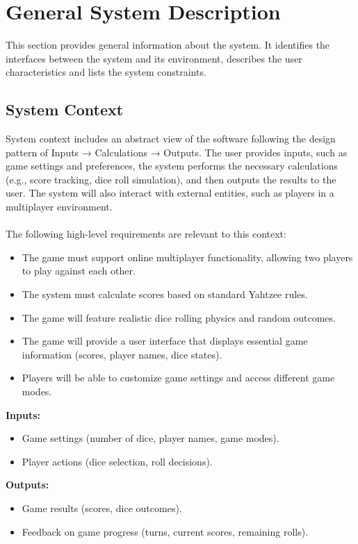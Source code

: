 \newpage
\section{General System Description}

This section provides general information about the system.  It identifies the
interfaces between the system and its environment, describes the user
characteristics and lists the system constraints.

\subsection{System Context}

System context includes an abstract view of the software following the design pattern of Inputs → Calculations → Outputs. The user provides inputs, such as game settings and preferences, the system performs the necessary calculations (e.g., score tracking, dice roll simulation), and then outputs the results to the user. The system will also interact with external entities, such as players in a multiplayer environment.\\
\\
\noindent The following high-level requirements are relevant to this context:

\begin{itemize}
    \item The game must support online multiplayer functionality, allowing two players to play against each other.
    \item The system must calculate scores based on standard Yahtzee rules.
    \item The game will feature realistic dice rolling physics and random outcomes.
    \item The game will provide a user interface that displays essential game information (scores, player names, dice states).
    \item Players will be able to customize game settings and access different game modes.
\end{itemize}

\noindent\textbf{Inputs:}
  \begin{itemize}
        \item Game settings (number of dice, player names, game modes).
        \item Player actions (dice selection, roll decisions).
  \end{itemize}
  
  \noindent\textbf{Outputs:}
  \begin{itemize}
      \item Game results (scores, dice outcomes).
      \item Feedback on game progress (turns, current scores, remaining rolls).
  \end{itemize}
  
